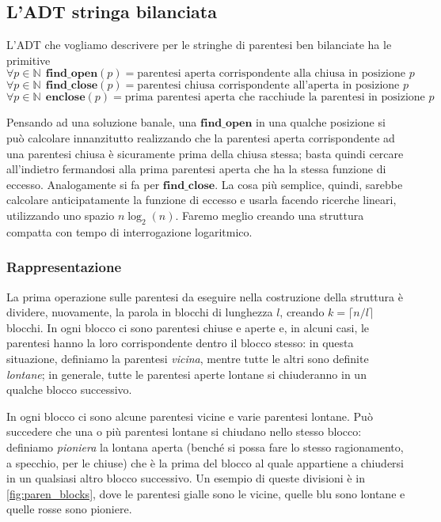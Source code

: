 \subsection{L'ADT stringa bilanciata}
L'ADT che vogliamo descrivere per le stringhe di parentesi ben bilanciate ha le primitive
$$
	\forall p \in \mathbb{N} ~~ \mathbf{find\_open}(p) = \text{parentesi aperta corrispondente alla chiusa in posizione } p
$$
$$
	\forall p \in \mathbb{N} ~~ \mathbf{find\_close}(p) = \text{parentesi chiusa corrispondente all'aperta in posizione } p
$$
$$
	\forall p \in \mathbb{N} ~~ \mathbf{enclose}(p) = \text{prima parentesi aperta che racchiude la parentesi in posizione } p
$$

Pensando ad una soluzione banale, una $\mathbf{find\_open}$ in una qualche posizione si può
calcolare innanzitutto realizzando che la parentesi aperta corrispondente ad una
parentesi chiusa è sicuramente prima della chiusa stessa; basta quindi cercare all'indietro fermandosi
alla prima parentesi aperta che ha la stessa funzione di eccesso. Analogamente si fa per $\mathbf{find\_close}$.
La cosa più semplice, quindi, sarebbe calcolare anticipatamente la funzione di eccesso e usarla
facendo ricerche lineari, utilizzando uno spazio $n \log_2(n)$.
Faremo meglio creando una struttura compatta con tempo di interrogazione logaritmico.

\subsubsection{Rappresentazione}
La prima operazione sulle parentesi da eseguire nella costruzione della struttura è dividere, nuovamente,
la parola in blocchi di lunghezza $l$, creando $k = \lceil n/l \rceil$ blocchi. In ogni blocco
ci sono parentesi chiuse e aperte e, in alcuni casi, le parentesi hanno la loro corrispondente
dentro il blocco stesso: in questa situazione, definiamo la parentesi \textit{vicina}, mentre
tutte le altri sono definite \textit{lontane}; in generale, tutte le parentesi aperte lontane
si chiuderanno in un qualche blocco successivo.

In ogni blocco ci sono alcune parentesi vicine e varie parentesi lontane. Può succedere
che una o più parentesi lontane si chiudano nello stesso blocco: definiamo \textit{pioniera}
la lontana aperta (benché si possa fare lo stesso ragionamento, a specchio, per le chiuse)
che è la prima del blocco al quale appartiene a chiudersi in un qualsiasi altro blocco successivo.
Un esempio di queste divisioni è in \cref{fig:paren_blocks}, dove le parentesi gialle sono le vicine,
quelle blu sono lontane e quelle rosse sono pioniere.

